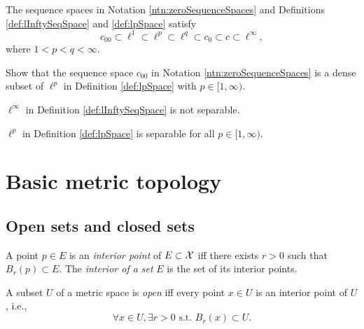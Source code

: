 \begin{lem}
  \label{lem:filtrationOfSequenceSpaces}
  The sequence spaces in Notation \ref{ntn:zeroSequenceSpaces}
  and Definitions \ref{def:lInftySeqSpace} and \ref{def:lpSpace}
  satisfy
  \begin{equation}
    \label{eq:filtrationOfSequenceSpaces}
    c_{00} \subset \ell^1 \subset \ell^p  \subset \ell^q  
     \subset c_0 \subset c \subset \ell^{\infty},
  \end{equation}
  where $1<p<q<\infty$. 
\end{lem}

\begin{exc}
  \label{exc:c00isDenseInEll2}
  Show that the sequence space $c_{00}$
  in Notation \ref{ntn:zeroSequenceSpaces}
  is a dense subset of $\ell^p$
  in Definition \ref{def:lpSpace} with $p\in[1,\infty)$. 
\end{exc}

\begin{lem}
  \label{lem:ellInftyisNotSeparable}
  $\ell^{\infty}$ in Definition \ref{def:lInftySeqSpace} is not separable.
\end{lem}

\begin{lem}
  \label{lem:ellPisSeparable}
  $\ell^p$ in Definition \ref{def:lpSpace} 
  is separable for all $p\in[1,\infty)$.
\end{lem}

\section{Basic metric topology}
\label{sec:metric-topology}

\subsection{Open sets and closed sets}
\label{sec:open-sets-closed}

\begin{defn}
  \label{def:interiorPoint}
  A point $p\in E$ is an \emph{interior point} of $E\subset {\cal X}$
  iff there exists $r>0$ such that $B_r(p)\subset E$.
  The \emph{interior of a set} $E$
  is the set of its interior points.
\end{defn}

\begin{defn}
  \label{def:openSetInMetricSpace}
  A subset $U$ of a metric space is \emph{open} iff
  every point $x\in U$ is an interior point of $U$, i.e., 
  \begin{displaymath}
    \forall x\in U, \exists r>0 \text{ s.t. }
    B_r(x)\subset U.
  \end{displaymath}
\end{defn}

